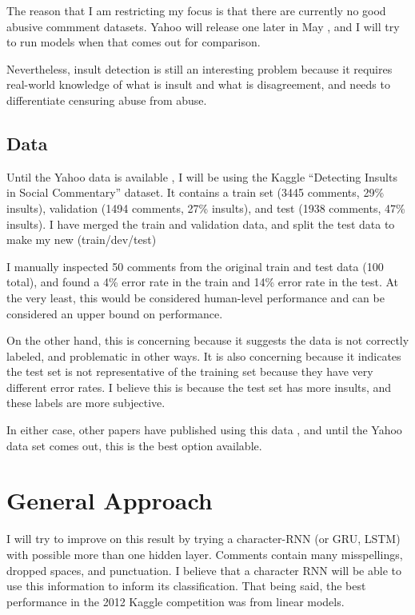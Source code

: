 \documentclass{article} %
\begin{document}
The reason that I am restricting my focus is that there are currently no good abusive commment datasets. Yahoo will release one later in May \cite{DBLP:conf/www/NobataTTMC16}, and I will try to run models when that comes out for comparison. 

Nevertheless, insult detection is still an interesting problem because it requires real-world knowledge of what is insult and what is disagreement, and needs to differentiate censuring abuse from abuse. 


\subsection{Data}
Until the Yahoo data is available \cite{DBLP:conf/www/NobataTTMC16}, I will be using the Kaggle ``Detecting Insults in Social Commentary'' dataset. It contains a train set (3445 comments, 29\% insults), validation (1494 comments, 27\% insults), and test (1938 comments, 47\% insults). I have merged the train and validation data, and split the test data to make my new (train/dev/test)

I manually inspected 50 comments from the original train and test data (100 total), and found a 4\% error rate in the train and 14\% error rate in the test. At the very least, this would be considered human-level performance and can be considered an upper bound on performance. 

On the other hand, this is concerning because it suggests the data is not correctly labeled, and problematic in other ways. It is also concerning because it indicates the test set is not representative of the training set because they have very different error rates. I believe this is because the test set has more insults, and these labels are more subjective. 

In either case, other papers have published using this data \cite{goyal2013peer}, and until the Yahoo data set comes out, this is the best option available. 

\section{General Approach}

I will try to improve on this result by trying a character-RNN (or GRU, LSTM) with possible more than one hidden layer. Comments contain many misspellings, dropped spaces, and punctuation. I believe that a character RNN will be able to use this information to inform its classification. That being said, the best performance in the 2012 Kaggle competition was from linear models. 
\end{document}
